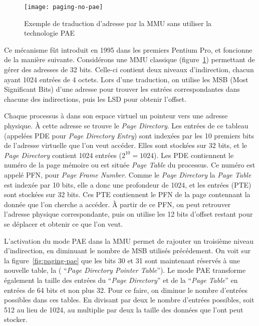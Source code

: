       \begin{figure}[h]
        \centering \texttt{[image: paging-no-pae]}
        \caption{Exemple de traduction d'adresse par la MMU sans utiliser la
          technologie PAE}
        \label{fig:paging-no-pae}
        \end{figure}
      
      Ce mécanisme fût introduit en 1995 dans les premiers Pentium Pro, et
      foncionne de la manière suivante. Considérons une MMU classique
      (figure~\ref{fig:paging-no-pae}) permettant de gérer des adresses de 32
      bits. Celle-ci contient deux niveaux d'indirection, chacun ayant 1024
      entrées de 4 octets. Lors d'une traduction, on utilise les MSB (Most
      Significant Bits) d'une adresse pour trouver les entrées correspondantes
      dans chacune des indirections, puis les LSD pour obtenir l'offset.

      Chaque processus à dans son espace virtuel un pointeur vers une adresse
      physique. À cette adresse se trouve le \textit{Page Directory}. Les
      entrées de ce tableau (appelées PDE pour \textit{Page Directory Entry})
      sont indexées par les 10 premiers bits de l'adresse virtuelle que l'on
      veut accéder. Elles sont stockées sur 32 bits, et le \textit{Page
        Directory} contient 1024 entrées ($2^{10} = 1024$). Les PDE contiennent
      le numéro de la page mémoire ou est située \textit{Page Table} du
      processus. Ce numéro est appelé PFN, pour \textit{Page Frame
        Number}. Comme le \textit{Page Directory} la \textit{Page Table} est
      indexée par 10 bits, elle a donc une profondeur de 1024, et les entrées
      (PTE) sont stockées sur 32 bits. Ces PTE contiennent le PFN de la page
      contennant la donnée que l'on cherche a accéder. À partir de ce PFN, on
      peut retrouver l'adresse physique correspondante, puis on utilise les 12
      bits d'offset restant pour se déplacer et obtenir ce que l'on veut.
      
      L'activation du mode PAE dans la MMU permet de rajouter un troisième
      niveau d'indirection, en diminuant le nombre de MSB utilisés
      précédement. On voit sur la figure~\ref{fig:paging-pae} que les bits 30 et
      31 sont maintenant réservés à une nouvelle table, la ( ``\textit{Page
        Directory Pointer Table}''). Le mode PAE transforme également la taille
      des entrées du ``\textit{Page Directory}'' et de la ``\textit{Page
        Table}'' en entrées de 64 bits et non plus 32. Pour ce faire, on diminue
      le nombre d'entrées possibles dans ces tables. En divisant par deux le
      nombre d'entrées possibles, soit 512 au lieu de 1024, au multiplie par
      deux la taille des données que l'ont peut stocker.

